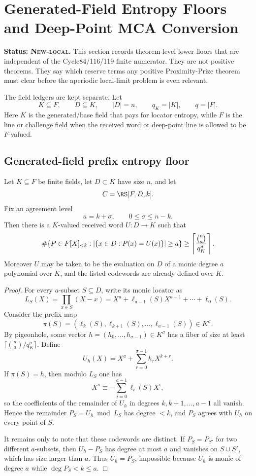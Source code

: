 \section{Generated-Field Entropy Floors and Deep-Point MCA Conversion}
\label{sec:entropy-mca-floors}

\textbf{Status: \textsc{New-local}.}
This section records theorem-level lower floors that are independent of the
Cycle84/116/119 finite numerator.  They are not positive theorems.  They say
which reserve terms any positive Proximity-Prize theorem must clear before the
aperiodic local-limit problem is even relevant.

The field ledgers are kept separate.  Let
\[
  K\subseteq F,
  \qquad D\subseteq K,
  \qquad |D|=n,
  \qquad q_K=|K|,
  \qquad q=|F|.
\]
Here \(K\) is the generated/base field that pays for locator entropy, while
\(F\) is the line or challenge field when the received word or deep-point line
is allowed to be \(F\)-valued.

\subsection{Generated-field prefix entropy floor}

\begin{theorem}
\label{thm:generated-prefix-list-floor}
Let \(K\subseteq F\) be finite fields, let \(D\subset K\) have size \(n\), and
let
\[
  C=\RS[F,D,k].
\]
Fix an agreement level
\[
  a=k+\sigma,\qquad 0\leq \sigma\leq n-k.
\]
Then there is a \(K\)-valued received word \(U:D\to K\) such that
\[
  \#\{P\in F[X]_{<k}: |\{x\in D:P(x)=U(x)\}|\geq a\}
  \geq
  \left\lceil {\binom{n}{a}\over q_K^{\sigma}}\right\rceil .
\]
Moreover \(U\) may be taken to be the evaluation on \(D\) of a monic degree
\(a\) polynomial over \(K\), and the listed codewords are already defined over
\(K\).
\end{theorem}

\begin{proof}
For every \(a\)-subset \(S\subseteq D\), write its monic locator as
\[
  L_S(X)=\prod_{x\in S}(X-x)
       =X^a+\ell_{a-1}(S)X^{a-1}+\cdots+\ell_0(S).
\]
Consider the prefix map
\[
  \pi(S)=(\ell_k(S),\ell_{k+1}(S),\ldots,\ell_{a-1}(S))\in K^\sigma .
\]
By pigeonhole, some vector \(h=(h_0,
\ldots,h_{\sigma-1})\in K^\sigma\) has a fiber of size at least
\(\lceil\binom{n}{a}/q_K^\sigma\rceil\).  Define
\[
  U_h(X)=X^a+\sum_{r=0}^{\sigma-1}h_r X^{k+r}.
\]
If \(\pi(S)=h\), then modulo \(L_S\) one has
\[
  X^a\equiv -\sum_{i=0}^{a-1}\ell_i(S)X^i,
\]
so the coefficients of the remainder of \(U_h\) in degrees
\(k,k+1,\ldots,a-1\) all vanish.  Hence the remainder \(P_S=U_h\bmod L_S\)
has degree \(<k\), and \(P_S\) agrees with \(U_h\) on every point of \(S\).

It remains only to note that these codewords are distinct.  If
\(P_S=P_{S'}\) for two different \(a\)-subsets, then \(U_h-P_S\) has degree at
most \(a\) and vanishes on \(S\cup S'\), which has size larger than \(a\).  Thus
\(U_h=P_S\), impossible because \(U_h\) is monic of degree \(a\) while
\(\deg P_S<k\leq a\).
\end{proof}

